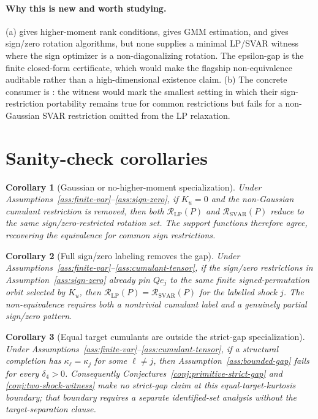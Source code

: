 \documentclass[11pt]{article}
\theoremstyle{definition}
\theoremstyle{plain}
\newtheorem{corollary}{Corollary}
\theoremstyle{remark}
\begin{document}
\paragraph{Why this is new and worth studying.}
(a) \citet{Guay2021} gives higher-moment rank conditions, \citet{LanneLuoto2021} gives GMM estimation, and \citet{Read2022} gives sign/zero rotation algorithms, but none supplies a minimal LP/SVAR witness where the sign optimizer is a non-diagonalizing rotation.  The epsilon-gap is the finite closed-form certificate, which would make the flagship non-equivalence auditable rather than a high-dimensional existence claim.  (b) The concrete consumer is \citet{PlagborgMollerWolf2021}: the witness would mark the smallest setting in which their sign-restriction portability remains true for common restrictions but fails for a non-Gaussian SVAR restriction omitted from the LP relaxation.

\section{Sanity-check corollaries}
\begin{corollary}[Gaussian or no-higher-moment specialization]\label{cor:gaussian}
Under Assumptions~\ref{ass:finite-var}--\ref{ass:sign-zero}, if \(K_u=0\) and the non-Gaussian cumulant restriction is removed, then both \(\mathcal R_{\mathrm{LP}}(P)\) and \(\mathcal R_{\mathrm{SVAR}}(P)\) reduce to the same sign/zero-restricted rotation set.  The support functions therefore agree, recovering the \citet{PlagborgMollerWolf2021} equivalence for common sign restrictions.
\end{corollary}

\begin{corollary}[Full sign/zero labeling removes the gap]\label{cor:full-label}
Under Assumptions~\ref{ass:finite-var}--\ref{ass:cumulant-tensor}, if the sign/zero restrictions in Assumption~\ref{ass:sign-zero} already pin \(Qe_j\) to the same finite signed-permutation orbit selected by \(K_u\), then \(\mathcal R_{\mathrm{LP}}(P)=\mathcal R_{\mathrm{SVAR}}(P)\) for the labelled shock \(j\).  The non-equivalence requires both a nontrivial cumulant label and a genuinely partial sign/zero pattern.
\end{corollary}

\begin{corollary}[Equal target cumulants are outside the strict-gap specialization]\label{cor:equal-kurtosis-boundary}
Under Assumptions~\ref{ass:finite-var}--\ref{ass:cumulant-tensor}, if a structural completion has \(\kappa_\ell=\kappa_j\) for some \(\ell\ne j\), then Assumption~\ref{ass:bounded-gap} fails for every \(\delta_4>0\).  Consequently Conjectures~\ref{conj:primitive-strict-gap} and \ref{conj:two-shock-witness} make no strict-gap claim at this equal-target-kurtosis boundary; that boundary requires a separate identified-set analysis without the target-separation clause.
\end{corollary}
\end{document}

